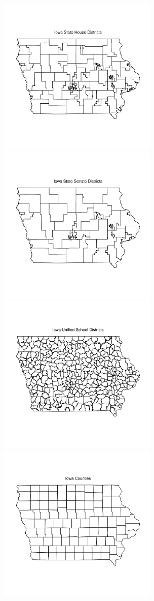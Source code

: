 \documentclass{article}\usepackage[]{graphicx}\usepackage[]{color}
\newenvironment{knitrout}{}{} %
\begin{document}
\begin{knitrout}
\begin{figure}[]
{\centering \includegraphics[width=3in]{figure/iowa1} 
\includegraphics[width=3in]{figure/iowa2} 
\includegraphics[width=3in]{figure/iowa3} 
\includegraphics[width=3in]{figure/iowa4} 

}
\end{figure}
\end{knitrout}
\end{document}

